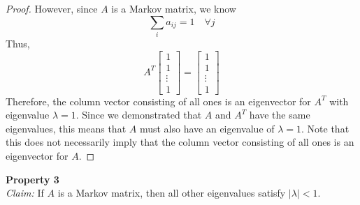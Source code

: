 \documentclass[10pt]{article}
\begin{document}
\begin{proof}
However, since $A$ is a Markov matrix, we know
\[\sum_i a_{ij} = 1 \quad\forall j\]
Thus,
\[A^T \left[\begin{array}{c}
     1\\
     1\\
     \vdots\\
     1
\end{array}\right] = \left[\begin{array}{c}
     1\\
     1\\
     \vdots\\
     1
\end{array}\right]\]
Therefore, the column vector consisting of all ones is an eigenvector for $A^T$ with eigenvalue $\lambda=1$. Since we demonstrated that $A$ and $A^T$ have the same eigenvalues, this means that $A$ must also have an eigenvalue of $\lambda=1$. Note that this does not necessarily imply that the column vector consisting of all ones is an eigenvector for $A$.
\end{proof}\vspace{0.5cm}
\textbf{Property 3}\\
\textit{Claim:} If $A$ is a Markov matrix, then all other eigenvalues satisfy $|\lambda|<1$.
\end{document}
